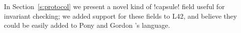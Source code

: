 In Section~\ref{s:protocol} we present a novel kind of \Q!capsule! field 
useful for invariant checking;
 we added support for these fields to L42, and believe they could be easily added to Pony and Gordon \etal's language.


